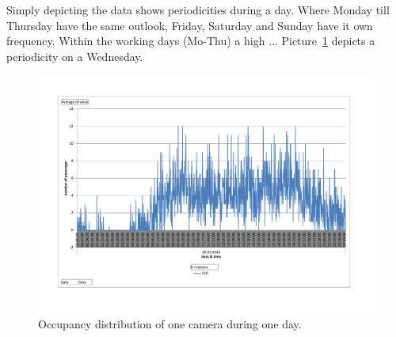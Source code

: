Simply depicting the data shows periodicities during a day. Where Monday till Thursday have the same outlook, Friday, Saturday and Sunday have it own frequency. Within the working days (Mo-Thu) a high ... Picture~\ref{fig:occupancyDatabase} depicts a periodicity on a Wednesday.

\begin{figure}[htb]
  \centering
  \includegraphics[width=\linewidth]{occupancyDatabase.pdf} 
  \caption{Occupancy distribution of one camera during one day. \cite{TMB}}
  \label{fig:occupancyDatabase}
\end{figure}
